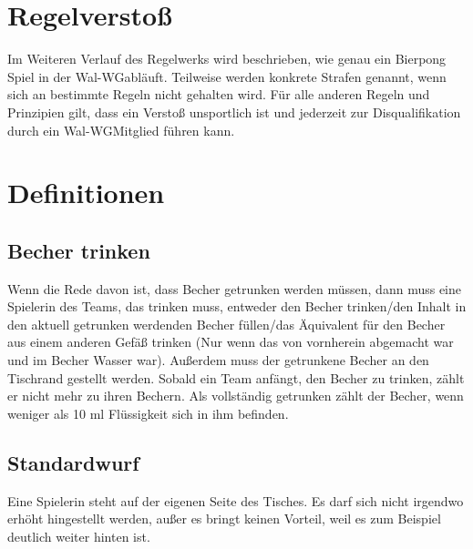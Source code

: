 \documentclass[a5paper, 12pt]{book}
\begin{document}
\chapter*{Regelverstoß}
Im Weiteren Verlauf des Regelwerks wird beschrieben, wie genau ein Bierpong Spiel in der Wal-WG\texttrademark abläuft. Teilweise werden konkrete Strafen genannt, wenn sich an bestimmte Regeln nicht gehalten wird. Für alle anderen Regeln und Prinzipien gilt, dass ein Verstoß unsportlich ist und jederzeit zur Disqualifikation durch ein Wal-WG\texttrademark Mitglied führen kann. 

\chapter{Definitionen}
\section{Becher trinken} \label{bechertrinken}
Wenn die Rede davon ist, dass Becher getrunken werden müssen, dann muss eine Spielerin des Teams, das trinken muss, entweder den Becher trinken/den Inhalt in den aktuell getrunken werdenden Becher füllen/das Äquivalent für den Becher aus einem anderen Gefäß trinken (Nur wenn das von vornherein abgemacht war und im Becher Wasser war). Außerdem muss der getrunkene Becher an den Tischrand gestellt werden. Sobald ein Team anfängt, den Becher zu trinken, zählt er nicht mehr zu ihren Bechern. Als vollständig getrunken zählt der Becher, wenn weniger als 10 ml Flüssigkeit sich in ihm befinden.
\section{Standardwurf}\label{standardwurf}
Eine Spielerin steht auf der eigenen Seite des Tisches. Es darf sich nicht irgendwo erhöht hingestellt werden, außer es bringt keinen Vorteil, weil es zum Beispiel deutlich weiter hinten ist. 
\end{document}
